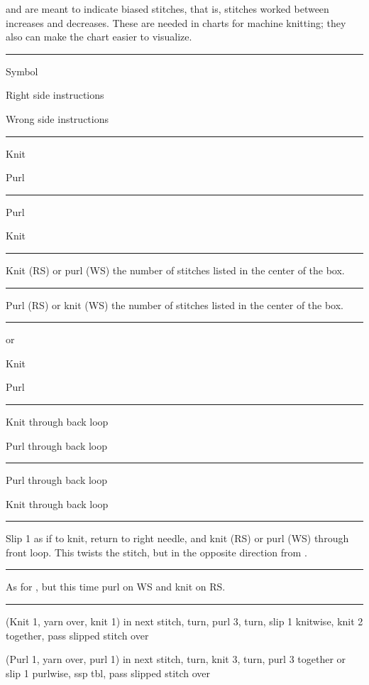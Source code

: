 \documentclass{article}
\newif \ifdesigner
\newlength{\symbolcolwidth}
\newlength{\singlecolwidth}
\newlength{\doublecolwidth}
\newcommand{\setcolwidths}[1]{
	\setlength{\symbolcolwidth}{#1}
	\addtolength{\symbolcolwidth}{1pt}
	\setlength{\doublecolwidth}{\textwidth}
	\addtolength{\doublecolwidth}{-4\tabcolsep}
	\addtolength{\doublecolwidth}{-1.2pt} %
	\addtolength{\doublecolwidth}{-\symbolcolwidth}
	\setlength{\singlecolwidth}{0.5\doublecolwidth}
	\addtolength{\singlecolwidth}{-1\tabcolsep}
	\addtolength{\singlecolwidth}{-0.2pt} %
	}
\newcommand\keyrow[3]{\par\allowbreak\hrule\par\nopagebreak\noindent
	\vrule\hfill 
	\begin{minipage}{\symbolcolwidth}\centering#1\end{minipage}%
	\hfill\vrule\hfill
	\begin{minipage}{\singlecolwidth}
		\raisebox{1pt}{\strut}#2\raisebox{-1pt}{\strut}\end{minipage}%
	\hfill\vrule\hfill
	\begin{minipage}{\singlecolwidth}
		\raisebox{1pt}{\strut}#3\raisebox{-1pt}{\strut}\end{minipage}%
	\hfill\vrule
	\par\nointerlineskip}
\newcommand\dblkeyrow[2]{\par\allowbreak\hrule\par\nopagebreak\noindent
	\vrule\hfill
	\begin{minipage}{\symbolcolwidth}\centering#1\end{minipage}%
	\hfill\vrule\hfill
	\begin{minipage}{\doublecolwidth}
		\raisebox{1pt}{\strut}#2\raisebox{-1pt}{\strut}\end{minipage}%
	\hfill\vrule
	\par\nointerlineskip}
\begin{document}
\begin{fullpages}
\textknit{(} and \textknit{)} are meant to indicate biased stitches, that is, stitches worked between increases and decreases. These are needed in charts for machine knitting; they also can make the chart easier to visualize.

\medskip

\fi

\setcolwidths{\dimen0} %

\keyrow{Symbol}{Right side instructions}{Wrong side instructions}
\keyrow{\textknit{-}}{Knit}{Purl}
\keyrow{\textknit{=}}{Purl}{Knit}
\dblkeyrow{}{Knit (RS) or purl (WS) the number of stitches listed in the center of the box.}
\dblkeyrow{}{Purl (RS) or knit (WS) the number of stitches listed in the center of the box.}
\keyrow{\textknit{)} or \textknit{(}}{Knit}{Purl}
\keyrow{}{Knit through back loop}{Purl through back loop}
\keyrow{}{Purl through back loop}{Knit through back loop}
\dblkeyrow{}{Slip 1 as if to knit, return to right needle, and knit (RS) or purl (WS) through front loop. This twists the stitch, but in the opposite direction from \textknit{b}.}
\dblkeyrow{}{As for , but this time purl on WS and knit on RS.}
\keyrow{}
{(Knit 1, yarn over, knit 1) in next stitch, turn, purl 3, turn, slip 1 knitwise, knit 2 together, pass slipped stitch over}
{(Purl 1, yarn over, purl 1) in next stitch, turn, knit 3, turn, purl 3 together or slip 1 purlwise, ssp tbl, pass slipped stitch over}

\ifdesigner\hrule\medskip
If you use bobbles, be sure to define ssp tbl somewhere.
\clearpage\fi


\end{fullpages}
\end{document}

